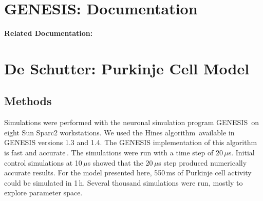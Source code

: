 \documentclass[12pt]{article}
\begin{document}
\section*{GENESIS: Documentation}

{\bf Related Documentation:}

\section*{De Schutter: Purkinje Cell Model}

\subsection*{Methods}

Simulations were performed with the neuronal simulation program
GENESIS\,\cite{Wilson:1989ff} on eight Sun Sparc2 workstations.
We used the Hines algorithm\,\cite{hines84:_effic} available in
GENESIS versions 1.3 and 1.4. The GENESIS implementation of
this algorithm is fast and accurate\,\cite{bhalla92:_rallp}. The simulations
were run with a time step of 20\,$\mu$s. Initial control simulations
at 10\,$\mu$s showed that the 20\,$\mu$s step produced numerically accurate
results. For the model presented here, 550\,ms of Purkinje cell
activity could be simulated in 1\,h. Several thousand simulations
were run, mostly to explore parameter space.



\end{document}
